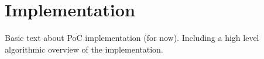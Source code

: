 \chapter{Implementation}
\label{chapter:implementation}
Basic text about PoC implementation (for now). Including a high level algorithmic overview of the implementation.